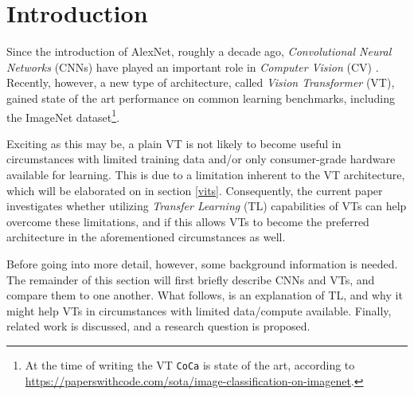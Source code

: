 \section{Introduction}
Since the introduction of AlexNet, roughly a decade ago, \textit{Convolutional Neural Networks} (CNNs) have played an important role in \textit{Computer Vision} (CV) \citep{krizhevsky2012imagened}. Recently, however, a new type of architecture, called \textit{Vision Transformer} (VT), gained state of the art performance on common learning benchmarks, including the ImageNet dataset\footnote{At the time of writing the VT \texttt{CoCa} is state of the art, according to \url{https://paperswithcode.com/sota/image-classification-on-imagenet}.}.

Exciting as this may be, a plain VT is not likely to become useful in circumstances with limited training data and/or only consumer-grade hardware available for learning. This is due to a limitation inherent to the VT architecture, which will be elaborated on in section \ref{vits}. Consequently, the current paper investigates whether utilizing \textit{Transfer Learning} (TL) capabilities of VTs can help overcome these limitations, and if this allows VTs to become the preferred architecture in the aforementioned circumstances as well.

Before going into more detail, however, some background information is needed. The remainder of this section will first briefly describe CNNs and VTs, and compare them to one another. What follows, is an explanation of TL, and why it might help VTs in circumstances with limited data/compute available. Finally, related work is discussed, and a research question is proposed.


